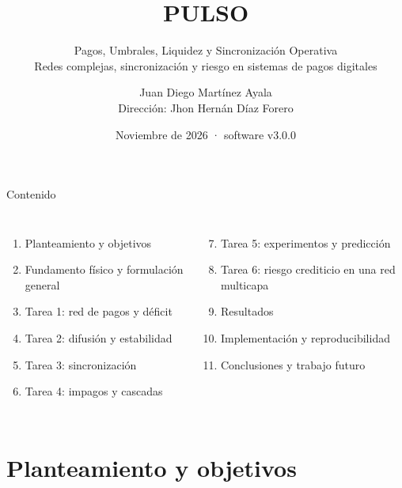 \documentclass[aspectratio=169,10pt]{beamer}
\title{PULSO}
\subtitle{Pagos, Umbrales, Liquidez y Sincronización Operativa\\[2pt]
\footnotesize Redes complejas, sincronización y riesgo en sistemas de pagos digitales}
\author{Juan Diego Martínez Ayala \\ \small Dirección: Jhon Hernán Díaz Forero}
\institute{\small Semillero de Modelamiento de Sistemas Complejos y Física Computacional}
\date{Noviembre de 2026 · software v3.0.0}
\begin{document}
\maketitle

\begin{frame}{Contenido}
\begin{columns}[T]
\begin{enumerate}
\item Planteamiento y objetivos
\item Fundamento físico y formulación general
\item Tarea 1: red de pagos y déficit
\item Tarea 2: difusión y estabilidad
\item Tarea 3: sincronización
\item Tarea 4: impagos y cascadas
\end{enumerate}
\begin{enumerate}\setcounter{enumi}{6}
\item Tarea 5: experimentos y predicción
\item Tarea 6: riesgo crediticio en una red multicapa
\item Resultados
\item Implementación y reproducibilidad
\item Conclusiones y trabajo futuro
\end{enumerate}
\end{columns}
\end{frame}

\section{Planteamiento y objetivos}
\end{document}
